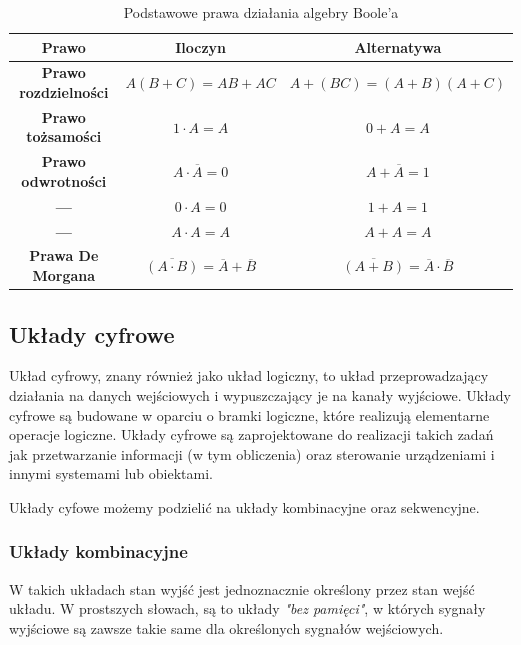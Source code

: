\documentclass{article}
\begin{document}
    \begin{table}[h]
      \centering
      \begin{tabular}{|c|c|c|}
      \hline
      \textbf{Prawo} & \textbf{Iloczyn} & \textbf{Alternatywa}\\
      \hline
      \textbf{Prawo rozdzielności}  & \footnotesize $A(B + C) = AB + AC$ & \footnotesize $A + (BC) = (A + B)(A + C)$\\
      \hline
      \textbf{Prawo tożsamości} & \footnotesize $ 1\cdot A = A$ & \footnotesize $ 0 + A = A$\\
      \hline
      \textbf{Prawo odwrotności} & \footnotesize $ A\cdot \overline{A} = 0$ & \footnotesize $ A + \overline{A} = 1$\\
      \hline
      \textbf{---} & \footnotesize $ 0 \cdot A = 0$ & \footnotesize $ 1 + A = 1$\\
      \hline
      \textbf{---} & \footnotesize $ A\cdot A = A$ & \footnotesize $ A + A = A$\\
      \hline
      \textbf{Prawa De Morgana} & \footnotesize $ \overline{(A \cdot B)} = \overline{A} + \overline{B}$ & \footnotesize $ \overline{(A + B)} = \overline{A} \cdot \overline{B}$\\
      \hline
      \end{tabular}
      \caption{Podstawowe prawa działania algebry Boole'a}
      \end{table}

    \subsection{Układy cyfrowe}
      Układ cyfrowy, znany również jako układ logiczny, to układ przeprowadzający działania na danych wejściowych i wypuszczający je na kanały wyjściowe. Układy cyfrowe są budowane w oparciu o bramki logiczne, które realizują elementarne operacje logiczne.
      Układy cyfrowe są zaprojektowane do realizacji takich zadań jak przetwarzanie informacji (w tym obliczenia) oraz sterowanie urządzeniami i innymi systemami lub obiektami.

      Układy cyfowe możemy podzielić na układy kombinacyjne oraz sekwencyjne.
      \subsubsection{Układy kombinacyjne}
        W takich układach stan wyjść jest jednoznacznie określony przez stan wejść układu.
        W prostszych słowach, są to układy \textit{"bez pamięci"}, w których sygnały wyjściowe są zawsze takie same dla określonych sygnałów wejściowych.
\end{document}
